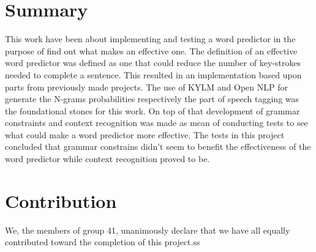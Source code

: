\section{Summary}
This work have been about implementing and testing a word predictor in the purpose of find out what makes an effective one. The definition of an effective word predictor was defined as one that could reduce the number of key-strokes needed to complete a sentence. This resulted in an implementation based upon parts from previously made projects. The use of KYLM and Open NLP for generate the N-grams probabilities respectively the part of speech tagging was the foundational stones for this work. On top of that development of grammar constraints and context recognition was made as mean of conducting tests to see what could make a word predictor more effective. The tests in this project concluded that grammar constrains didn’t seem to benefit the effectiveness of the word predictor while context recognition proved to be.  
\section{Contribution}
We, the members of group 41, unanimously declare that we have all equally contributed toward the completion of this project.ss